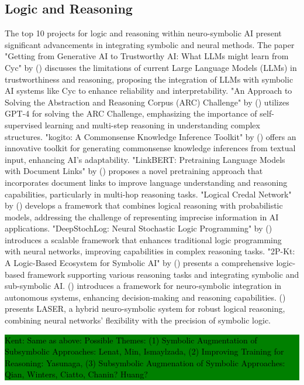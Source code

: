 \documentclass[hf]{ceurart}
\newcommand{\citeauthornum}[1]{\citeauthor{#1} (\citeyear{#1}) \cite{#1}}
\newcommand{\pinaforecomment}[4]{\colorbox{#1}{\textcolor{#4}{\parbox{.8\linewidth}{#2: #3}}}}
\newcommand{\osullikomment}[1]{\pinaforecomment{green}{Kent}{#1}{black}}
\begin{document}
\subsection{Logic and Reasoning}\label{subsec:disc_logic}
The top 10 projects for logic and reasoning within neuro-symbolic AI present significant advancements in integrating symbolic and neural methods. The paper "Getting from Generative AI to Trustworthy AI: What LLMs might learn from Cyc" by \citeauthornum{Lenat2023} discusses the limitations of current Large Language Models (LLMs) in trustworthiness and reasoning, proposing the integration of LLMs with symbolic AI systems like Cyc to enhance reliability and interpretability. "An Approach to Solving the Abstraction and Reasoning Corpus (ARC) Challenge" by \citeauthornum{Min2023} utilizes GPT-4 for solving the ARC Challenge, emphasizing the importance of self-supervised learning and multi-step reasoning in understanding complex structures. "kogito: A Commonsense Knowledge Inference Toolkit" by \citeauthornum{Ismayilzada2022} offers an innovative toolkit for generating commonsense knowledge inferences from textual input, enhancing AI's adaptability. "LinkBERT: Pretraining Language Models with Document Links" by \citeauthornum{Yasunaga2022} proposes a novel pretraining approach that incorporates document links to improve language understanding and reasoning capabilities, particularly in multi-hop reasoning tasks. "Logical Credal Network" by \citeauthornum{Qian2021} develops a framework that combines logical reasoning with probabilistic models, addressing the challenge of representing imprecise information in AI applications. "DeepStochLog: Neural Stochastic Logic Programming" by \citeauthornum{Winters2021} introduces a scalable framework that enhances traditional logic programming with neural networks, improving capabilities in complex reasoning tasks. "2P-Kt: A Logic-Based Ecosystem for Symbolic AI" by \citeauthornum{Ciatto2021} presents a comprehensive logic-based framework supporting various reasoning tasks and integrating symbolic and sub-symbolic AI. \citeauthornum{Chanin2023} introduces a framework for neuro-symbolic integration in autonomous systems, enhancing decision-making and reasoning capabilities. \citeauthornum{Huang2023} presents LASER, a hybrid neuro-symbolic system for robust logical reasoning, combining neural networks' flexibility with the precision of symbolic logic. 

\osullikomment{Same as above: Possible Themes: (1) Symbolic Augmentation of Subsymbolic Approaches: Lenat, Min, Ismaylzada, (2) Improving Training for Reasoning: Yasunaga, (3) Subsymbolic Augmenation of Symbolic Approaches: Qian, Winters, Ciatto, Chanin? Huang?}
 
\end{document}
